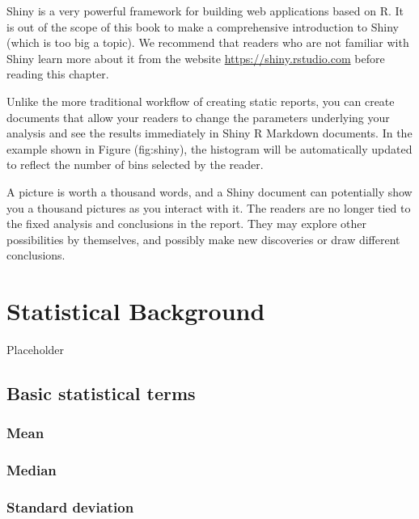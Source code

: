 \documentclass[12pt, krantz2,]{krantz}
\begin{document}
Shiny is a very powerful framework for building web applications based on R. It is out of the scope of this book to make a comprehensive introduction to Shiny (which is too big a topic). We recommend that readers who are not familiar with Shiny learn more about it from the website \url{https://shiny.rstudio.com} before reading this chapter.

Unlike the more traditional workflow of creating static reports, you can create documents that allow your readers to change the parameters underlying your analysis and see the results immediately in Shiny R Markdown documents. In the example shown in Figure \citet{ref}(fig:shiny), the histogram will be automatically updated to reflect the number of bins selected by the reader.

A picture is worth a thousand words, and a Shiny document can potentially show you a thousand pictures as you interact with it. The readers are no longer tied to the fixed analysis and conclusions in the report. They may explore other possibilities by themselves, and possibly make new discoveries or draw different conclusions.

\hypertarget{appendix-appendix}{%
\appendix {}}


\hypertarget{appendixA}{%
\chapter{Statistical Background}\label{appendixA}}

Placeholder

\hypertarget{basic-statistical-terms}{%
\section{Basic statistical terms}\label{basic-statistical-terms}}

\hypertarget{mean}{%
\subsection{Mean}\label{mean}}

\hypertarget{median}{%
\subsection{Median}\label{median}}

\hypertarget{standard-deviation}{%
\subsection{Standard deviation}\label{standard-deviation}}
\end{document}
